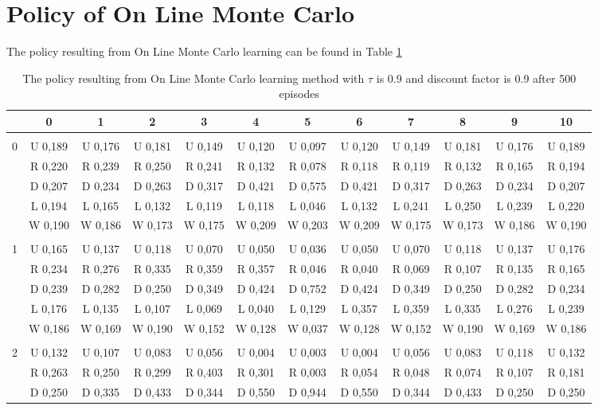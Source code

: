 \documentclass{article}
\begin{document}
\section{Policy of On Line Monte Carlo} \label{policyOnLineMonteCarlo}
The policy resulting from On Line Monte Carlo learning can be found in Table \ref{policyOnline}
 \begin{table}[htbp]
\caption{The policy resulting from On Line Monte Carlo learning method with $\tau$ is 0.9 and discount factor is 0.9 after 500 episodes}
\label{policyOnline}
\centering
\begin{footnotesize}
\begin{tabular}{c|c|c|c|c|c|c|c|c|c|c|c|}
&0&1&2&3&4&5&6&7&8&9&10\\ \hline\\
0&U 0,189&U 0,176&U 0,181&U 0,149&U 0,120&U 0,097&U 0,120&U 0,149&U 0,181&U 0,176&U 0,189\\
&R 0,220&R 0,239&R 0,250&R 0,241&R 0,132&R 0,078&R 0,118&R 0,119&R 0,132&R 0,165&R 0,194\\
&D 0,207&D 0,234&D 0,263&D 0,317&D 0,421&D 0,575&D 0,421&D 0,317&D 0,263&D 0,234&D 0,207\\
&L 0,194&L 0,165&L 0,132&L 0,119&L 0,118&L 0,046&L 0,132&L 0,241&L 0,250&L 0,239&L 0,220\\
&W 0,190&W 0,186&W 0,173&W 0,175&W 0,209&W 0,203&W 0,209&W 0,175&W 0,173&W 0,186&W 0,190\\
\hline \\
1&U 0,165&U 0,137&U 0,118&U 0,070&U 0,050&U 0,036&U 0,050&U 0,070&U 0,118&U 0,137&U 0,176\\
&R 0,234&R 0,276&R 0,335&R 0,359&R 0,357&R 0,046&R 0,040&R 0,069&R 0,107&R 0,135&R 0,165\\
&D 0,239&D 0,282&D 0,250&D 0,349&D 0,424&D 0,752&D 0,424&D 0,349&D 0,250&D 0,282&D 0,234\\
&L 0,176&L 0,135&L 0,107&L 0,069&L 0,040&L 0,129&L 0,357&L 0,359&L 0,335&L 0,276&L 0,239\\
&W 0,186&W 0,169&W 0,190&W 0,152&W 0,128&W 0,037&W 0,128&W 0,152&W 0,190&W 0,169&W 0,186\\
\hline \\
2&U 0,132&U 0,107&U 0,083&U 0,056&U 0,004&U 0,003&U 0,004&U 0,056&U 0,083&U 0,118&U 0,132\\
&R 0,263&R 0,250&R 0,299&R 0,403&R 0,301&R 0,003&R 0,054&R 0,048&R 0,074&R 0,107&R 0,181\\
&D 0,250&D 0,335&D 0,433&D 0,344&D 0,550&D 0,944&D 0,550&D 0,344&D 0,433&D 0,250&D 0,250\\

\end{tabular}
\end{footnotesize}
\end{table}
\end{document}
